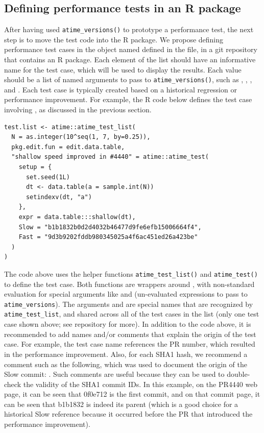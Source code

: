\subsection{Defining performance tests in an R package}
After having used \verb|atime_versions()| to prototype a performance test, the next step is to move the test code into the R package. 
We propose defining performance test cases in the object named  defined in the  file, in a git repository  that contains an R package.
Each element of the list should have an informative name for the test case, which will be used to display the results.
Each value should be a list of named arguments to pass to \verb|atime_versions()|, such as , , , and  .
Each test case is typically created based on a historical regression or performance improvement. 
For example, the R code below defines the test case involving , as discussed in the previous section.
\begin{Schunk}
\begin{verbatim}
test.list <- atime::atime_test_list(
  N = as.integer(10^seq(1, 7, by=0.25)),
  pkg.edit.fun = edit.data.table,
  "shallow speed improved in #4440" = atime::atime_test(
    setup = {
      set.seed(1L)
      dt <- data.table(a = sample.int(N))
      setindexv(dt, "a")
    },
    expr = data.table:::shallow(dt),
    Slow = "b1b1832b0d2d4032b46477d9fe6efb15006664f4", 
    Fast = "9d3b9202fddb980345025a4f6ac451ed26a423be"
  )
)
\end{verbatim}
\end{Schunk}
The code above uses the helper functions \verb|atime_test_list()| and \verb|atime_test()| to define the test case.
Both functions are wrappers around , with non-standard evaluation for special arguments like  and  (un-evaluated expressions to pass to \verb|atime_versions|). 
The arguments  and  are special names that are recognized by \verb|atime_test_list|, and shared across all of the test cases in the list (only one test case shown above; see  repository for more).
In addition to the code above, it is recommended to add names and/or comments that explain the origin of the test case.
For example, the test case name  references the PR number, which resulted in the performance improvement.
Also, for each SHA1 hash, we recommend a comment such as the following, which was used to document the origin of the Slow commit:
.
Such comments are useful because they can be used to double-check the validity of the SHA1 commit IDs.
In this example, on the PR4440 web page, it can be seen that 0f0e712 is the first commit, and on that commit page, it can be seen that b1b1832 is indeed its parent (which is a good choice for a historical Slow reference because it occurred before the PR that introduced the performance improvement).

